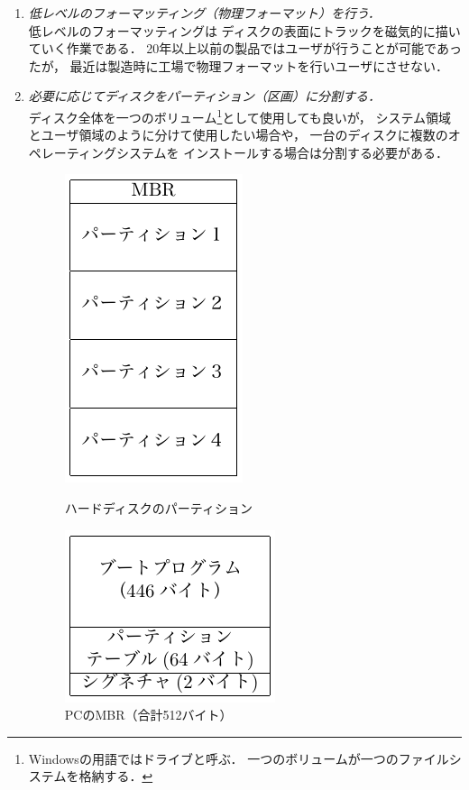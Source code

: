 \begin{enumerate}
\item \emph{低レベルのフォーマッティング（物理フォーマット）を行う．}\\
  低レベルのフォーマッティングは
  ディスクの表面にトラックを磁気的に描いていく作業である．
  20年以上以前の製品ではユーザが行うことが可能であったが，
  最近は製造時に工場で物理フォーマットを行いユーザにさせない．
\item \emph{必要に応じてディスクをパーティション（区画）に分割する．}\\
  ディスク全体を一つのボリューム\footnote{
    Windowsの用語ではドライブと呼ぶ．
    一つのボリュームが一つのファイルシステムを格納する．
  }として使用しても良いが，
  システム領域とユーザ領域のように分けて使用したい場合や，
  一台のディスクに複数のオペレーティングシステムを
  インストールする場合は分割する必要がある．

  \begin{figure}[btp]
    \begin{center}
      \begin{minipage}{0.49\columnwidth}
        \centerline{\includegraphics[scale=1.0]{Fig/hddPartition.pdf}}
        \caption{ハードディスクのパーティション}\label{fig:hddPartition}
      \end{minipage}
      \begin{minipage}{0.49\columnwidth}
        \centerline{\includegraphics[scale=1.0]{Fig/masterBootRecord.pdf}}
        \caption{PCのMBR（合計512バイト）}\label{fig:masterBootRecord}
      \end{minipage}
    \end{center}
  \end{figure}


\end{enumerate}

